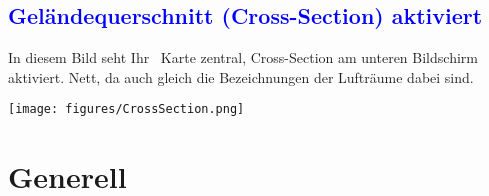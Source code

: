 \documentclass[german,a4paper,12pt]{refrep}
\begin{document}
\subsection*{\textcolor{blue}{Geländequerschnitt (Cross-Section) aktiviert}}
In diesem Bild seht Ihr \xc~Karte zentral, Cross-Section am unteren Bildschirm aktiviert. Nett, da auch gleich die Bezeichnungen 
der Lufträume dabei sind.
\begin{center}
 \texttt{[image: figures/CrossSection.png]}
\end{center}
\newpage\section{Generell}\label{ch:generell}
\end{document}
